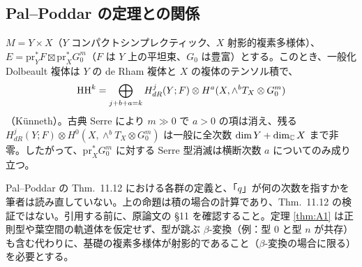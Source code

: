 \subsection{Pal--Poddar の定理との関係}
\begin{prop}[積の場合の整合性]\tP\label{prop:PPprod}
$M=Y\times X$（$Y$ コンパクトシンプレクティック、$X$ 射影的複素多様体）、$E=\mathrm{pr}_Y^*F\boxtimes\mathrm{pr}_X^*G_0^m$（$F$ は $Y$ 上の平坦束、$G_0$ は豊富）とする。このとき、一般化 Dolbeault 複体は $Y$ の de Rham 複体と $X$ の複体のテンソル積で、
\[\mathrm{HH}^k=\bigoplus_{j+b+a=k}H^j_{dR}(Y;F)\otimes H^a(X,\wedge^bT_X\otimes G_0^m)\]
（Künneth）。古典 Serre により $m\gg0$ で $a>0$ の項は消え、残る $H^j_{dR}(Y;F)\otimes H^0(X,\wedge^bT_X\otimes G_0^m)$ は一般に全次数 $\dim Y+\dim_\mathbb C X$ まで非零。したがって、$\mathrm{pr}_X^*G_0^m$ に対する Serre 型消滅は横断次数 $a$ についてのみ成り立つ。
\end{prop}
\begin{rem}[\tQ]
Pal--Poddar の Thm.\ 11.12 における各群の定義と、「$q$」が何の次数を指すかを筆者は読み直していない。上の命題は積の場合の計算であり、Thm.\ 11.12 の検証ではない。引用する前に、原論文の \S11 を確認すること。定理 \ref{thm:A1} は正則型や葉空間の軌道体を仮定せず、型が跳ぶ $\beta$-変換（例：型 0 と型 $n$ が共存）も含む代わりに、基礎の複素多様体が射影的であること（$\beta$-変換の場合に限る）を必要とする。
\end{rem}

